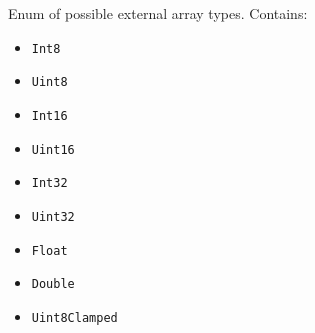Enum of possible external array types. Contains:

\begin{itemize}
\itemsep1pt\parskip0pt
\item
  \texttt{Int8}
\item
  \texttt{Uint8}
\item
  \texttt{Int16}
\item
  \texttt{Uint16}
\item
  \texttt{Int32}
\item
  \texttt{Uint32}
\item
  \texttt{Float}
\item
  \texttt{Double}
\item
  \texttt{Uint8Clamped}
\end{itemize}
